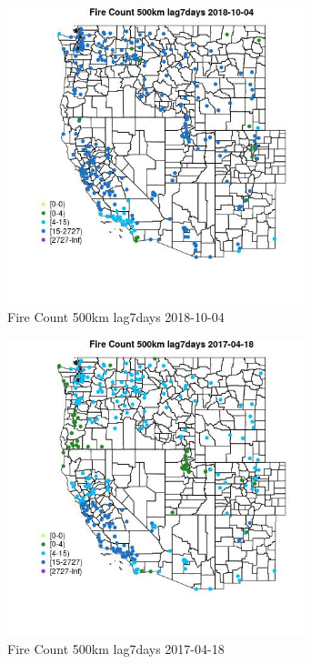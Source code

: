 \begin{figure} 
\centering  
\includegraphics[width=0.77\textwidth]{Code_Outputs/Report_ML_input_PM25_Step4_part_f_de_duplicated_aves_prioritize_24hr_obswNAs_MapObsFire_Count_500km_lag7days2018-10-04.jpg} 
\caption{\label{fig:Report_ML_input_PM25_Step4_part_f_de_duplicated_aves_prioritize_24hr_obswNAsMapObsFire_Count_500km_lag7days2018-10-04}Fire Count 500km lag7days 2018-10-04} 
\end{figure} 
 

\begin{figure} 
\centering  
\includegraphics[width=0.77\textwidth]{Code_Outputs/Report_ML_input_PM25_Step4_part_f_de_duplicated_aves_prioritize_24hr_obswNAs_MapObsFire_Count_500km_lag7days2017-04-18.jpg} 
\caption{\label{fig:Report_ML_input_PM25_Step4_part_f_de_duplicated_aves_prioritize_24hr_obswNAsMapObsFire_Count_500km_lag7days2017-04-18}Fire Count 500km lag7days 2017-04-18} 
\end{figure} 
 

